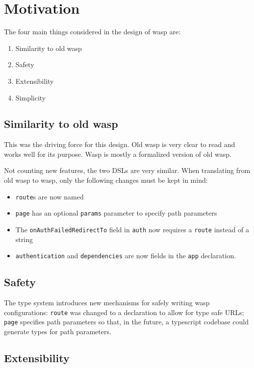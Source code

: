 \section{Motivation}

The four main things considered in the design of wasp are:

\begin{enumerate}
  \item Similarity to old wasp
  \item Safety
  \item Extensibility
  \item Simplicity
\end{enumerate}

\subsection{Similarity to old wasp}

This was the driving force for this design. Old wasp is very clear to read and
works well for its purpose. Wasp is mostly a formalized version of old wasp.

Not counting new features, the two DSLs are very similar. When translating
from old wasp to wasp, only the following changes must be kept in mind:

\begin{itemize}
  \item \texttt{route}s are now named
  \item \texttt{page} has an optional \texttt{params} parameter to specify
        path parameters
  \item The \texttt{onAuthFailedRedirectTo} field in \texttt{auth} now requires
        a \texttt{route} instead of a string
  \item \texttt{authentication} and \texttt{dependencies} are now fields in the
        \texttt{app} declaration.
\end{itemize}

\subsection{Safety}

The type system introduces new mechanisms for safely writing wasp
configurations: \texttt{route} was changed to a declaration to allow for
type safe URLs; \texttt{page} specifies path parameters so that, in the future,
a typescript codebase could generate types for path parameters.

\subsection{Extensibility}

